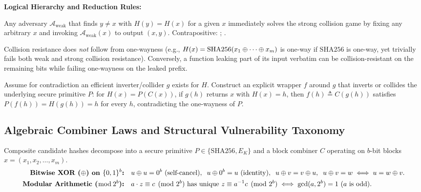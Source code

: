 \textbf{Logical Hierarchy and Reduction Rules:}
\begin{compactitem}
  \item {} Any adversary $\mathcal{A}_{\text{weak}}$ that finds $y \neq x$ with $H(y)=H(x)$ for a given $x$ immediately solves the strong collision game by fixing any arbitrary $x$ and invoking $\mathcal{A}_{\text{weak}}(x)$ to output $(x, y)$. Contrapositive: ; .
  \item {} Collision resistance does \emph{not} follow from one-wayness (e.g., $H(x) = \mathrm{SHA256}(x_1 \oplus \cdots \oplus x_m)$ is one-way if $\mathrm{SHA256}$ is one-way, yet trivially fails both weak and strong collision resistance). Conversely, a function leaking part of its input verbatim can be collision-resistant on the remaining bits while failing one-wayness on the leaked prefix.
  \item {} Assume for contradiction an efficient inverter/collider $g$ exists for $H$. Construct an explicit wrapper $f$ around $g$ that inverts or collides the underlying secure primitive $P$: for $H(x) = P(C(x))$, if $g(h)$ returns $x$ with $H(x)=h$, then $f(h) \triangleq C(g(h))$ satisfies $P(f(h)) = H(g(h)) = h$ for every $h$, contradicting the one-wayness of $P$.
\end{compactitem}

\subsection{Algebraic Combiner Laws and Structural Vulnerability Taxonomy}
Composite candidate hashes decompose into a secure primitive $P \in \{\mathrm{SHA256}, E_K\}$ and a block combiner $C$ operating on $b$-bit blocks $x = (x_1, x_2, \dots, x_m)$.
\begin{align*}
  \textbf{Bitwise XOR ($\oplus$) on $\{0,1\}^b$:} \quad & u \oplus u = 0^b \text{ (self-cancel)}, \;\; u \oplus 0^b = u \text{ (identity)}, \;\; u \oplus v = v \oplus u, \;\; u \oplus v = w \iff u = w \oplus v. \\
  \textbf{Modular Arithmetic ($\bmod\, 2^b$):} \quad & a \cdot z \equiv c \pmod{2^b} \text{ has unique } z \equiv a^{-1} c \pmod{2^b} \iff \gcd(a, 2^b) = 1 \text{ ($a$ is odd)}.
\end{align*}


